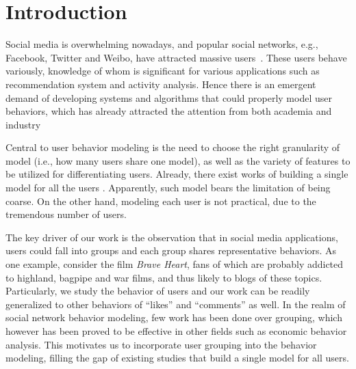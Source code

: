 \section{Introduction}
\label{sec:intro}

\par Social media is overwhelming nowadays, and popular social networks, e.g., Facebook, Twitter and Weibo, have attracted  massive users~\cite{DBLP:journals/fcsc/MaLHLH16,DBLP:journals/tkde/DuanMAMH17,DBLP:conf/icde/HuAMH16,IEEEexample:conf/wsdm/FengW13,IEEEexample:conf/ijcai/ZhangLTCL13}.
These users behave variously, knowledge of whom is significant for various applications such as recommendation system and activity analysis.
Hence there is an emergent demand of developing systems and algorithms that could properly model user behaviors, which has already attracted the attention from both academia and industry~\cite{IEEEexample:conf/wsdm/FengW13,IEEEexample:conf/ijcai/ZhangLTCL13,IEEEexample:conf/cikm/JiangLSW15,IEEEexample:conf/sigir/JiangLSLLMW16,IEEEexample:zhang2015retweet,IEEEexample:conf/pakdd/GiatsoglouCSFV15,IEEEexample:journals/corr/RanganathMHTL15}

Central to user behavior modeling is the need to choose the right granularity of model (i.e., how many users share one model), as well as the variety of features to be utilized for differentiating users.
Already, there exist works of building a single model for all the users \cite{IEEEexample:conf/wsdm/FengW13,IEEEexample:conf/ijcai/ZhangLTCL13}.
Apparently, such model bears the limitation of being coarse.
On the other hand, modeling each user is not practical, due to the tremendous number of users.

The key driver of our work is the observation that in social media applications, users could fall into groups and each group shares representative behaviors.
%
As one example, consider the film \textit{Brave Heart}, fans of which are probably addicted to highland, bagpipe and war films, and thus likely to \ret{} blogs of these topics.
Particularly, we study the \retg{} behavior of users and our work can be readily generalized to other behaviors of ``likes'' and ``comments'' as well.
In the realm of social network behavior modeling, few work has been done over grouping, which however has been proved to be effective in other fields such as economic behavior analysis.
This motivates us to incorporate user grouping into the \retg{} behavior modeling, filling the gap of existing studies that build a single model for all users.

